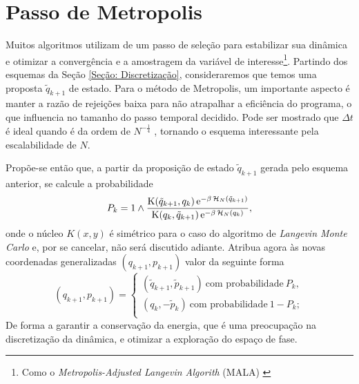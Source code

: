 \section{Passo de Metropolis}
\label{Section: Metropolis}

Muitos algoritmos utilizam de um passo de seleção para estabilizar sua dinâmica e otimizar a convergência e a amostragem da variável de interesse\footnote{Como o \textit{Metropolis-Adjusted Langevin Algorith} (MALA) \cite[Anexo~C]{leimmolecular}}. Partindo dos esquemas da Seção \ref{Seção: Discretização}, consideraremos que temos uma proposta $\tilde{q}_{k+1}$ de estado. Para o método de Metropolis, um importante aspecto é manter a razão de rejeições baixa para não atrapalhar a eficiência do programa, o que influencia no tamanho do passo temporal decidido. Pode ser mostrado que $\Delta t$ é ideal quando é da ordem de $N^{-\frac{1}{4}}$ \cite{Chafa2018}, tornando o esquema interessante pela escalabilidade de $N$.

Propõe-se então que, a partir da proposição de estado $\tilde{q}_{k+1}$ gerada pelo esquema anterior, se calcule a probabilidade
\begin{equation}
P_k = 1 \wedge \frac{\operatorname{K}(\tilde{q}_{k+1}, q_k) \operatorname{e}^{-\beta \operatorname{\mathcal{H}}_N(\tilde{q}_{k+1})}}{\operatorname{K}(q_k, \tilde{q}_{k+1}) \operatorname{e}^{-\beta \operatorname{\mathcal{H}}_N(q_{k})}},
\label{Equation: Pk}
\end{equation}
onde o núcleo $K(x, y)$ é simétrico \cite{Chafa2018} para o caso do algoritmo de \textit{Langevin Monte Carlo} e, por se cancelar, não será discutido adiante. Atribua agora às novas coordenadas generalizadas $(q_{k+1}, p_{k+1})$ valor da seguinte forma
\begin{equation}
	(q_{k+1}, p_{k+1}) =
\begin{cases}
	(\tilde{q}_{k+1}, \tilde{p}_{k+1}) \ \text{com probabilidade} \ P_k, \\
	(q_k, -\tilde{p}_{k}) \ \text{com probabilidade} \ 1-P_k; \\
\end{cases}
\label{Equation: Metropolis}
\end{equation}
De forma a garantir a conservação da energia, que é uma preocupação na discretização da dinâmica, e otimizar a exploração do espaço de fase.